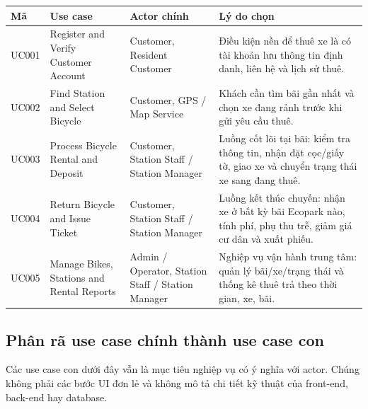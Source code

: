 \begin{longtable}{P{0.13\textwidth}P{0.31\textwidth}P{0.22\textwidth}P{0.24\textwidth}}
\toprule
\textbf{Mã} & \textbf{Use case} & \textbf{Actor chính} & \textbf{Lý do chọn} \\
\midrule
UC001 & Register and Verify Customer Account & Customer, Resident Customer & Điều kiện nền để thuê xe là có tài khoản lưu thông tin định danh, liên hệ và lịch sử thuê. \\
UC002 & Find Station and Select Bicycle & Customer, GPS / Map Service & Khách cần tìm bãi gần nhất và chọn xe đang rảnh trước khi gửi yêu cầu thuê. \\
UC003 & Process Bicycle Rental and Deposit & Customer, Station Staff / Station Manager & Luồng cốt lõi tại bãi: kiểm tra thông tin, nhận đặt cọc/giấy tờ, giao xe và chuyển trạng thái xe sang đang thuê. \\
UC004 & Return Bicycle and Issue Ticket & Customer, Station Staff / Station Manager & Luồng kết thúc chuyến: nhận xe ở bất kỳ bãi Ecopark nào, tính phí, phụ thu trễ, giảm giá cư dân và xuất phiếu. \\
UC005 & Manage Bikes, Stations and Rental Reports & Admin / Operator, Station Staff / Station Manager & Nghiệp vụ vận hành trung tâm: quản lý bãi/xe/trạng thái và thống kê thuê trả theo thời gian, xe, bãi. \\
\bottomrule
\end{longtable}

\subsection{Phân rã use case chính thành use case con}
Các use case con dưới đây vẫn là mục tiêu nghiệp vụ có ý nghĩa với actor. Chúng
không phải các bước UI đơn lẻ và không mô tả chi tiết kỹ thuật của front-end,
back-end hay database.

